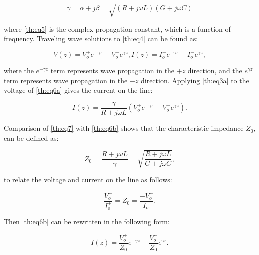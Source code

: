 \begin{equation}\label{th:eq5}
\gamma = \alpha + j\beta = \sqrt{(R+j\omega L)(G+j\omega C)}
\end{equation}

\noindent where \ref{th:eq5} is the complex propagation constant, which is a function of frequency. Traveling wave solutions to \ref{th:eq4} can be found as:

\begin{subequations}\label{th:eq6}
\begin{equation}\label{th:eq6a}
V(z)=V_{o}^{+}e^{-\gamma z}+V_{o}^{-}e^{\gamma z},
\end{equation}
\begin{equation}\label{th:eq6b}
I(z)=I_{o}^{+}e^{-\gamma z}+I_{o}^{-}e^{\gamma z},
\end{equation}
\end{subequations}

\noindent where the $e^{-\gamma z}$ term represents wave propagation in the $+z$ direction, and the $e^{\gamma z}$ term represents wave propagation in the $-z$ direction. Applying \ref{th:eq3a} to the voltage of \ref{th:eq6a} gives the current on the line:

\begin{equation}\label{th:eq7}
I(z)=\frac{\gamma}{R+j\omega L}(V_{o}^{+}e^{-\gamma z}+V_{o}^{-}e^{\gamma z}).
\end{equation}

\indent Comparison of \ref{th:eq7} with \ref{th:eq6b} shows that the characteristic impedance $Z_{0}$, can be defined as:

\begin{equation}\label{th:eq8}
Z_{0}=\frac{R+j\omega L}{\gamma}=\sqrt{\frac{R+j\omega L}{G+j\omega C}},
\end{equation}

\noindent to relate the voltage and current on the line as follows:

\begin{equation}\label{th:eq9}
\frac{V_{o}^{+}}{I_{o}^{+}}=Z_{0}=\frac{-V_{o}^{-}}{I_{o}^{-}}.
\end{equation}

\noindent Then \ref{th:eq6b} can be rewritten in the following form:

\begin{equation}\label{th:eq10}
I(z)=\frac{V_{o}^{+}}{Z_{0}}e^{-\gamma z}-\frac{V_{o}^{-}}{Z_{0}}e^{\gamma z}.
\end{equation}

